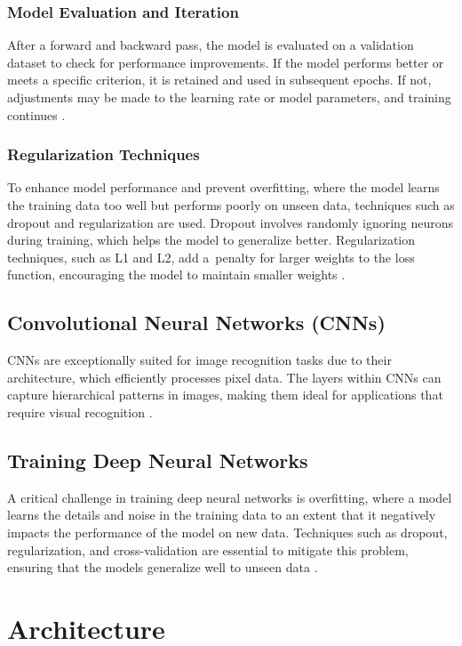 \subsubsection{Model Evaluation and Iteration}
After a forward and backward pass, the model is evaluated on a validation dataset to check for performance improvements. If the model performs better or meets a specific criterion, it is retained and used in subsequent epochs. If not, adjustments may be made to the learning rate or model parameters, and training continues \cite{tano2020accelerating}.

\subsubsection{Regularization Techniques}
To enhance model performance and prevent overfitting, where the model learns the training data too well but performs poorly on unseen data, techniques such as dropout and regularization are used. Dropout involves randomly ignoring neurons during training, which helps the model to generalize better. Regularization techniques, such as L1 and L2, add a~penalty for larger weights to the loss function, encouraging the model to maintain smaller weights \cite{dishar2023overfitting}.

\subsection{Convolutional Neural Networks (CNNs)}
CNNs are exceptionally suited for image recognition tasks due to their architecture, which efficiently processes pixel data. The layers within CNNs can capture hierarchical patterns in images, making them ideal for applications that require visual recognition \cite{goodfellow2016deep, pak2017review}.

\subsection{Training Deep Neural Networks}
A critical challenge in training deep neural networks is overfitting, where a model learns the details and noise in the training data to an extent that it negatively impacts the performance of the model on new data. Techniques such as dropout, regularization, and cross-validation are essential to mitigate this problem, ensuring that the models generalize well to unseen data \cite{dishar2023overfitting}.

\newpage
\section{Architecture}

